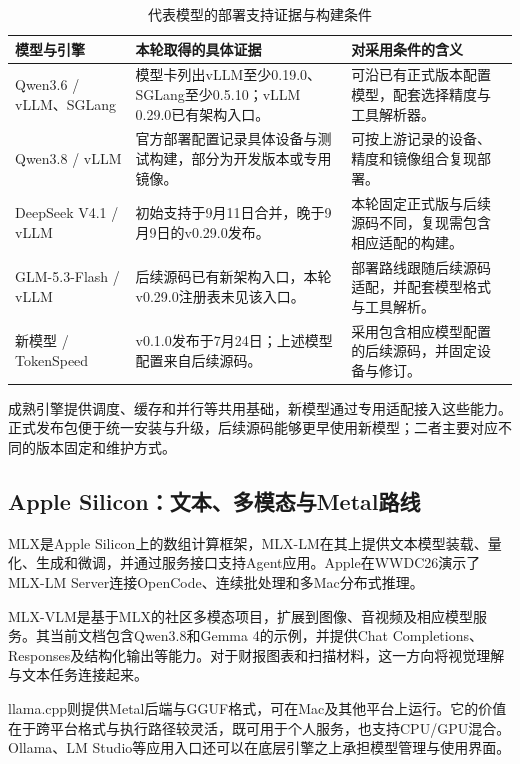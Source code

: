 \begin{table}[H]\small\centering
\caption{代表模型的部署支持证据与构建条件}\label{tab:build-support}
\begin{tabularx}{\linewidth}{@{}P{28mm}Y Y@{}}\toprule
模型与引擎 & 本轮取得的具体证据 & 对采用条件的含义\\\midrule
Qwen3.6 / vLLM、SGLang & 模型卡列出vLLM至少0.19.0、SGLang至少0.5.10；vLLM 0.29.0已有架构入口。 & 可沿已有正式版本配置模型，配套选择精度与工具解析器。\\
Qwen3.8 / vLLM & 官方部署配置记录具体设备与测试构建，部分为开发版本或专用镜像。 & 可按上游记录的设备、精度和镜像组合复现部署。\\
DeepSeek V4.1 / vLLM & 初始支持于9月11日合并，晚于9月9日的v0.29.0发布。 & 本轮固定正式版与后续源码不同，复现需包含相应适配的构建。\\
GLM-5.3-Flash / vLLM & 后续源码已有新架构入口，本轮v0.29.0注册表未见该入口。 & 部署路线跟随后续源码适配，并配套模型格式与工具解析。\\
新模型 / TokenSpeed & v0.1.0发布于7月24日；上述模型配置来自后续源码。 & 采用包含相应模型配置的后续源码，并固定设备与修订。\\\bottomrule
\end{tabularx}
\end{table}

成熟引擎提供调度、缓存和并行等共用基础，新模型通过专用适配接入这些能力。正式发布包便于统一安装与升级，后续源码能够更早使用新模型；二者主要对应不同的版本固定和维护方式。

\subsection{Apple Silicon：文本、多模态与Metal路线}
MLX是Apple Silicon上的数组计算框架，MLX-LM在其上提供文本模型装载、量化、生成和微调，并通过服务接口支持Agent应用。Apple在WWDC26演示了MLX-LM Server连接OpenCode、连续批处理和多Mac分布式推理。

MLX-VLM是基于MLX的社区多模态项目，扩展到图像、音视频及相应模型服务。其当前文档包含Qwen3.8和Gemma 4的示例，并提供Chat Completions、Responses及结构化输出等能力。对于财报图表和扫描材料，这一方向将视觉理解与文本任务连接起来。

llama.cpp则提供Metal后端与GGUF格式，可在Mac及其他平台上运行。它的价值在于跨平台格式与执行路径较灵活，既可用于个人服务，也支持CPU/GPU混合。Ollama、LM Studio等应用入口还可以在底层引擎之上承担模型管理与使用界面。

